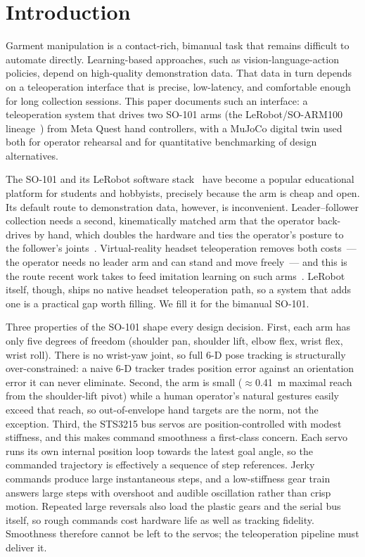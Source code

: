 \section{Introduction}
\label{sec:intro}

Garment manipulation is a contact-rich, bimanual task that remains
difficult to automate directly. Learning-based approaches, such as
vision-language-action policies, depend on high-quality demonstration
data. That data in turn depends on a teleoperation interface that is
precise, low-latency, and comfortable enough for long collection
sessions. This paper documents such an interface: a teleoperation system
that drives two SO-101 arms (the LeRobot/SO-ARM100
lineage~\citep{soarm100}) from Meta Quest hand controllers, with a MuJoCo
digital twin used both for operator rehearsal and for quantitative
benchmarking of design alternatives.

The SO-101 and its LeRobot software stack~\citep{lerobot} have become a
popular educational platform for students and hobbyists, precisely
because the arm is cheap and open. Its default route to demonstration
data, however, is inconvenient. Leader--follower collection needs a
second, kinematically matched arm that the operator back-drives by hand,
which doubles the hardware and ties the operator's posture to the
follower's joints~\citep{soarm100}. Virtual-reality headset
teleoperation removes both costs~--- the operator needs no leader arm and
can stand and move freely~--- and this is the route recent work takes to
feed imitation learning on such arms~\citep{levr}. LeRobot itself,
though, ships no native headset teleoperation path, so a system that adds
one is a practical gap worth filling. We fill it for the bimanual SO-101.

Three properties of the SO-101 shape every design decision. First, each
arm has only five degrees of freedom (shoulder pan, shoulder lift, elbow
flex, wrist flex, wrist roll). There is no wrist-yaw joint, so full 6-D
pose tracking is structurally over-constrained: a naive 6-D tracker
trades position error against an orientation error it can never
eliminate. Second, the arm is small (\(\approx\)\SI{0.41}{m} maximal
reach from the shoulder-lift pivot) while a human operator's natural
gestures easily exceed that reach, so out-of-envelope hand targets are
the norm, not the exception. Third, the STS3215 bus servos are
position-controlled with modest stiffness, and this makes command
smoothness a first-class concern. Each servo runs its own internal
position loop towards the latest goal angle, so the commanded trajectory
is effectively a sequence of step references. Jerky commands produce
large instantaneous steps, and a low-stiffness gear train answers large
steps with overshoot and audible oscillation rather than crisp motion.
Repeated large reversals also load the plastic gears and the serial bus
itself, so rough commands cost hardware life as well as tracking
fidelity. Smoothness therefore cannot be left to the servos; the
teleoperation pipeline must deliver it.

